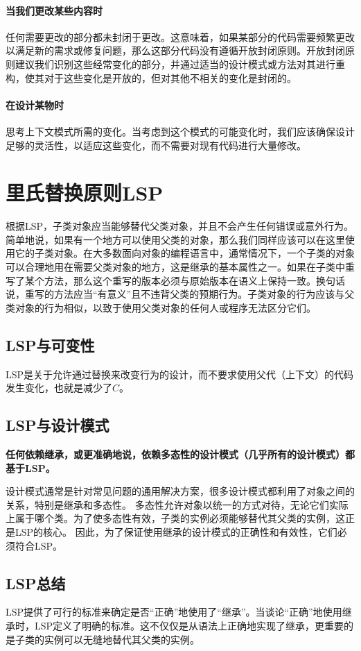 \paragraph{当我们更改某些内容时}
任何需要更改的部分都未封闭于更改。这意味着，如果某部分的代码需要频繁更改以满足新的需求或修复问题，那么这部分代码没有遵循开放封闭原则。开放封闭原则建议我们识别这些经常变化的部分，并通过适当的设计模式或方法对其进行重构，使其对于这些变化是开放的，但对其他不相关的变化是封闭的。
\paragraph{在设计某物时}思考上下文模式所需的变化。当考虑到这个模式的可能变化时，我们应该确保设计足够的灵活性，以适应这些变化，而不需要对现有代码进行大量修改。

\section{里氏替换原则LSP}

根据LSP，子类对象应当能够替代父类对象，并且不会产生任何错误或意外行为。简单地说，如果有一个地方可以使用父类的对象，那么我们同样应该可以在这里使用它的子类对象。在大多数面向对象的编程语言中，通常情况下，一个子类的对象可以合理地用在需要父类对象的地方，这是继承的基本属性之一。如果在子类中重写了某个方法，那么这个重写的版本必须与原始版本在语义上保持一致。换句话说，重写的方法应当“有意义”且不违背父类的预期行为。子类对象的行为应该与父类对象的行为相似，以致于使用父类对象的任何人或程序无法区分它们。

\subsection{LSP与可变性}
LSP是关于允许通过替换来改变行为的设计，而不要求使用父代（上下文）的代码发生变化，也就是减少了$C$。

\subsection{LSP与设计模式}
\textbf{任何依赖继承，或更准确地说，依赖多态性的设计模式（几乎所有的设计模式）都基于LSP。}

设计模式通常是针对常见问题的通用解决方案，很多设计模式都利用了对象之间的关系，特别是继承和多态性。
多态性允许对象以统一的方式对待，无论它们实际上属于哪个类。为了使多态性有效，子类的实例必须能够替代其父类的实例，这正是LSP的核心。
因此，为了保证使用继承的设计模式的正确性和有效性，它们必须符合LSP。

\subsection{LSP总结}
LSP提供了可行的标准来确定是否“正确”地使用了“继承”。当谈论“正确”地使用继承时，LSP定义了明确的标准。这不仅仅是从语法上正确地实现了继承，更重要的是子类的实例可以无缝地替代其父类的实例。

